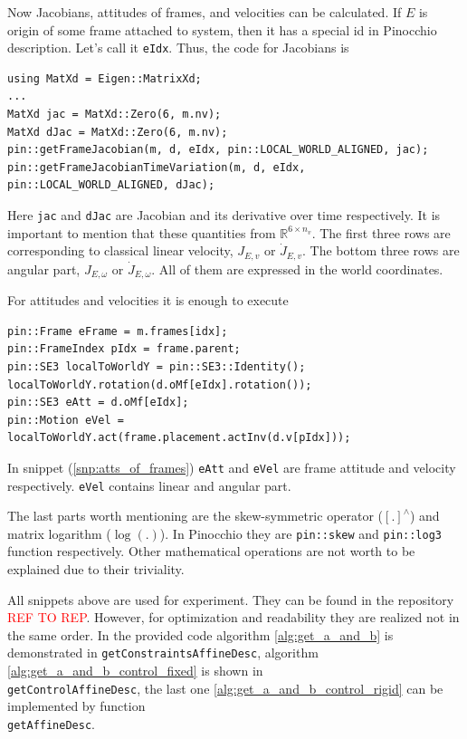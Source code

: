Now Jacobians, attitudes of frames, and velocities can be calculated. If $E$ is 
origin of some frame attached to system, then it has a special id in Pinocchio 
description. Let's call it \texttt{eIdx}. Thus, the code for Jacobians is

\begin{lstlisting}[caption={Jacobians}, label=snp:jacs]
using MatXd = Eigen::MatrixXd;
...
MatXd jac = MatXd::Zero(6, m.nv);
MatXd dJac = MatXd::Zero(6, m.nv);
pin::getFrameJacobian(m, d, eIdx, pin::LOCAL_WORLD_ALIGNED, jac);
pin::getFrameJacobianTimeVariation(m, d, eIdx, pin::LOCAL_WORLD_ALIGNED, dJac);
\end{lstlisting}

Here \texttt{jac} and \texttt{dJac} are Jacobian and its derivative over time 
respectively. It is important to mention that these quantities from 
$\mathbb{R}^{6 \times n_v}$. The first three rows are corresponding to 
classical linear velocity, $J_{E,v}$ or $\dot{J}_{E,v}$. The bottom three rows are 
angular part, $J_{E,\omega}$ or $\dot{J}_{E,\omega}$. All of them are expressed 
in the world coordinates.

For attitudes and velocities it is enough to execute

\begin{lstlisting}[caption={Attitudes of frames}, label=snp:atts_of_frames]
pin::Frame eFrame = m.frames[idx];
pin::FrameIndex pIdx = frame.parent;
pin::SE3 localToWorldY = pin::SE3::Identity();
localToWorldY.rotation(d.oMf[eIdx].rotation());
pin::SE3 eAtt = d.oMf[eIdx]; 
pin::Motion eVel = localToWorldY.act(frame.placement.actInv(d.v[pIdx]));
\end{lstlisting}

In snippet (\ref{snp:atts_of_frames}) \texttt{eAtt} and \texttt{eVel} are 
frame attitude and velocity respectively. \texttt{eVel} contains linear and 
angular part.

The last parts worth mentioning are the skew-symmetric operator ($[.]^{\wedge}$) 
and matrix logarithm ($\log (.)$). In Pinocchio they are \texttt{pin::skew} and 
\texttt{pin::log3} function respectively. Other mathematical operations are not 
worth to be explained due to their triviality. 

All snippets above are used for experiment. They can be found in the repository 
\textcolor{red}{REF TO REP}. However, for optimization and readability they 
are realized not in the same order. In the provided code algorithm 
\ref{alg:get_a_and_b} is demonstrated in \texttt{getConstraintsAffineDesc}, 
algorithm \ref{alg:get_a_and_b_control_fixed} is shown in \\
\texttt{getControlAffineDesc}, the last one \ref{alg:get_a_and_b_control_rigid} 
can be implemented by function \\ \texttt{getAffineDesc}.

